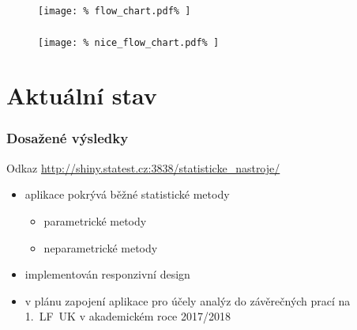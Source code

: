 \documentclass[t, compress]{beamer}
\begin{document}

\begin{frame}
  \frametitle{}
  \begin{figure}
    \centering
    \vspace{-0.35cm}
    \texttt{[image: \%
      flow\_chart.pdf\%
    ]}
  \end{figure}
\end{frame}



\begin{frame}
  \frametitle{}
  \begin{figure}
    \centering
    \vspace{-0.2cm}
    \texttt{[image: \%
      nice\_flow\_chart.pdf\%
    ]}
  \end{figure}
\end{frame}



\section{Aktuální stav}


\begin{frame}
  \frametitle{%
    Dosažené výsledky%
  }
  \begin{block}{\centering Odkaz}
    \center
    \href{%
      http://shiny.statest.cz:3838/statisticke\_nastroje/%
    }{%
      http://shiny.statest.cz:3838/statisticke\_nastroje/%
    }
  \end{block}
  \begin{itemize}
    \item aplikace pokrývá běžné statistické metody
    \begin{itemize}
      \item parametrické metody
      \item neparametrické metody
    \end{itemize}
    \item implementován responzivní design
    \item v plánu zapojení aplikace pro účely analýz do závěrečných
    prací na \mbox{1. LF UK} v akademickém roce 2017/2018
  \end{itemize}
\end{frame}
\end{document}
